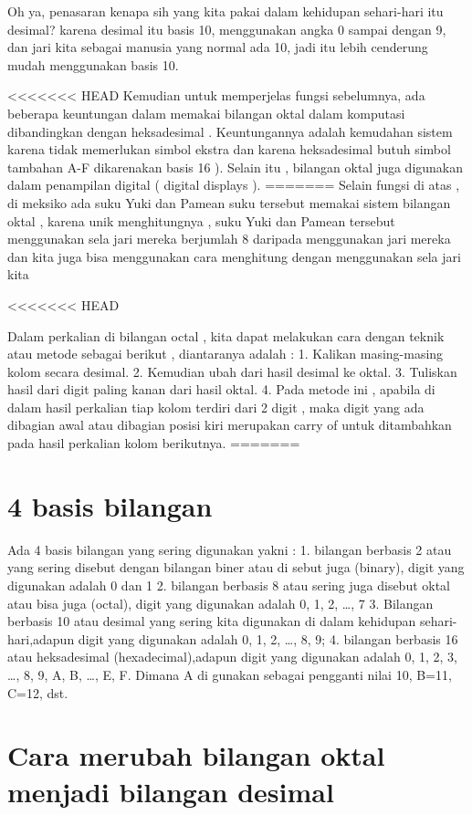 Oh ya, penasaran kenapa sih yang kita pakai dalam kehidupan sehari-hari itu desimal? karena desimal itu basis 10, menggunakan angka 0 sampai dengan 9, dan jari kita sebagai manusia yang normal ada 10, jadi itu lebih cenderung  mudah menggunakan basis 10.

<<<<<<< HEAD
Kemudian  untuk memperjelas fungsi sebelumnya, ada beberapa keuntungan dalam memakai bilangan oktal dalam komputasi dibandingkan dengan heksadesimal . Keuntungannya adalah kemudahan sistem karena tidak memerlukan simbol ekstra dan karena heksadesimal butuh simbol tambahan A-F dikarenakan basis 16 ). Selain itu , bilangan oktal juga digunakan dalam penampilan digital ( digital displays ).
=======
Selain fungsi di atas  , di meksiko ada suku Yuki dan Pamean suku tersebut memakai sistem bilangan oktal , karena unik menghitungnya , suku Yuki dan Pamean tersebut menggunakan sela jari mereka berjumlah 8 daripada menggunakan jari mereka dan kita juga bisa menggunakan cara menghitung dengan menggunakan sela jari kita 

<<<<<<< HEAD

Dalam perkalian di bilangan octal , kita dapat melakukan cara dengan teknik atau metode sebagai berikut , diantaranya adalah :
1.	Kalikan masing-masing kolom secara desimal.
2.	Kemudian ubah dari hasil desimal ke oktal.
3.	Tuliskan hasil dari digit paling kanan dari hasil oktal.
4.	Pada metode ini , apabila di dalam hasil perkalian tiap kolom terdiri dari 2 digit , maka digit yang ada dibagian awal atau dibagian posisi kiri merupakan carry of untuk ditambahkan pada hasil perkalian kolom berikutnya.
=======
\section{4 basis bilangan }

Ada 4 basis bilangan yang sering digunakan yakni :
1. bilangan berbasis 2 atau yang sering disebut dengan bilangan biner atau di sebut juga (binary), digit yang digunakan adalah 0 dan 1
2. bilangan berbasis 8 atau sering juga disebut oktal atau bisa juga (octal), digit yang digunakan adalah 0, 1, 2, …, 7
3. Bilangan berbasis 10 atau desimal yang sering kita digunakan di dalam kehidupan sehari-hari,adapun digit yang digunakan adalah 0, 1, 2, …, 8, 9; 
4. bilangan berbasis 16 atau heksadesimal (hexadecimal),adapun digit yang digunakan adalah 0, 1, 2, 3, …, 8, 9, A, B, …, E, F. Dimana A di gunakan sebagai pengganti nilai 10, B=11, C=12, dst.

\section{Cara merubah bilangan oktal menjadi bilangan desimal}

